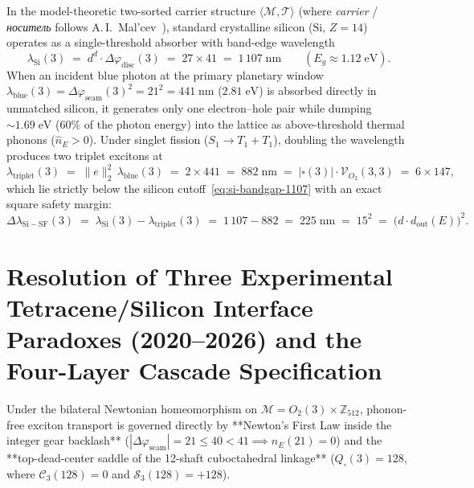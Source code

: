 \documentclass[11pt,a4paper]{article}
\theoremstyle{plain}
\theoremstyle{definition}
\begin{document}
In the model-theoretic two-sorted carrier structure $\langle\mathcal{M},\mathcal{T}\rangle$ (where \emph{carrier} / \emph{носитель} follows A.\,I.~Mal'cev~\cite{Malcev1973}), standard crystalline silicon ($\mathrm{Si}$, $Z = 14$) operates as a single-threshold absorber with band-edge wavelength
\begin{equation}
  \label{eq:si-bandgap-1107}
  \lambda_{\mathrm{Si}}(3) \;=\; d^d\cdot\Delta\varphi_{\mathrm{disc}}(3) \;=\; 27\times 41 \;=\; 1\,107\;\text{nm} \qquad (E_g\approx 1.12\;\text{eV}).
\end{equation}
When an incident blue photon at the primary planetary window $\lambda_{\mathrm{blue}}(3) = \Delta\varphi_{\mathrm{seam}}(3)^2 = 21^2 = 441\;\text{nm}$ ($2.81\;\text{eV}$) is absorbed directly in unmatched silicon, it generates only one electron--hole pair while dumping $\sim 1.69\;\text{eV}$ ($60\%$ of the photon energy) into the lattice as above-threshold thermal phonons ($\hat{n}_E > 0$). Under singlet fission ($S_1\to T_1 + T_1$), doubling the wavelength produces two triplet excitons at
\begin{equation}
  \label{eq:triplet-882}
  \lambda_{\mathrm{triplet}}(3) \;=\; \|e\|_2^2\,\lambda_{\mathrm{blue}}(3) \;=\; 2\times 441 \;=\; 882\;\text{nm} \;=\; |\square(3)|\cdot\mathcal{V}_{O_2}(3,3) \;=\; 6\times 147,
\end{equation}
which lie strictly below the silicon cutoff~\eqref{eq:si-bandgap-1107} with an exact square safety margin:
\begin{equation}
  \label{eq:sf-margin-225}
  \Delta\lambda_{\mathrm{Si-SF}}(3) \;=\; \lambda_{\mathrm{Si}}(3) - \lambda_{\mathrm{triplet}}(3) \;=\; 1\,107 - 882 \;=\; 225\;\text{nm} \;=\; 15^2 \;=\; \bigl(d\cdot d_{\mathrm{out}}(E)\bigr)^2.
\end{equation}

\section{Resolution of Three Experimental Tetracene/Silicon Interface Paradoxes (2020--2026) and the Four-Layer Cascade Specification}
\label{sec:three-paradoxes}

Under the bilateral Newtonian homeomorphism on $\mathcal{M} = O_2(3)\times\mathbb{Z}_{512}$, phonon-free exciton transport is governed directly by **Newton's First Law inside the integer gear backlash** ($|\Delta\varphi_{\mathrm{seam}}| = 21 \le 40 < 41 \implies \hat{n}_E(21) = 0$) and the **top-dead-center saddle of the 12-shaft cuboctahedral linkage** ($Q_\square(3) = 128$, where $\mathcal{C}_3(128) = 0$ and $\mathcal{S}_3(128) = +128$).
\end{document}
